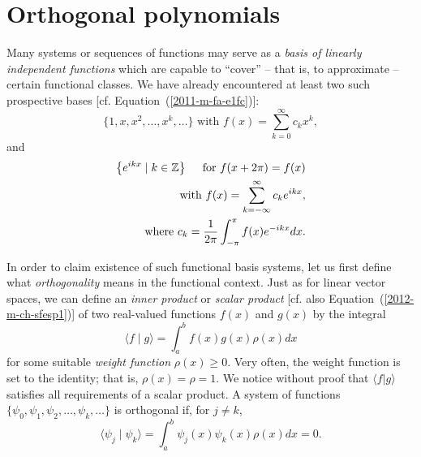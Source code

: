 \section{Orthogonal polynomials}
\label{2012-m-sf-fs}

Many systems or sequences of functions may serve as a {\em basis of linearly independent functions}
which are capable to ``cover'' -- that is, to approximate -- certain functional classes.\cite{herman-sc,Marcellan}
We have already encountered at least two such prospective bases [cf. Equation~(\ref{2011-m-fa-e1fc})]:
\begin{equation}
\{1,x,x^2,\ldots ,x^k,\ldots \} \textrm { with } f(x) =\sum_{k=0}^\infty c_k x^k,
\label{2011-m-ch-sfe1}
\end{equation}
and
\begin{equation}
\begin{split}
\left\{e^{ikx} \mid k\in {\Bbb Z} \right\} \quad \textrm{ for } f(x+2\pi)=f(x) \\
\qquad \textrm {  with }
f(x)= \sum _{k=-\infty}^\infty c_k e^{ikx},\\
\qquad  \textrm{  where }
c_k=\frac{1}{2\pi}\int_{-\pi}^\pi f(x) e^{-ikx} dx.
\end{split}
\end{equation}

In order to claim existence of such functional basis systems, let us first define what  {\em orthogonality} means in the  functional context.
Just as for linear vector spaces, we can define an
{\em inner product}
or {\em scalar product}
[cf. also Equation~(\ref{2012-m-ch-sfesp1})]
of two real-valued functions $f(x)$ and $g(x)$ by the integral\cite{Wilf}
\begin{equation}
\langle   f \mid g\rangle
=
\int_a^b f(x)g(x) \rho(x) dx
\label{2011-m-ch-sfesp}
\end{equation}
for some suitable {\em weight function} $\rho (x)\ge 0$.  
Very often, the weight function is set to the identity; that is,
$\rho(x) =\rho =1$.
We notice without proof that $\langle   f \vert g\rangle  $ satisfies all requirements of a scalar product.
A system of functions $\{\psi_0,\psi_1,\psi_2,\ldots ,\psi_k,\ldots \}$
is orthogonal if, for $j\neq k$,
\begin{equation}
\langle   \psi_j \mid \psi_k\rangle
=
\int_a^b \psi_j(x)\psi_k(x) \rho(x) dx
=0.
\label{2011-m-ch-sfespof}
\end{equation}


